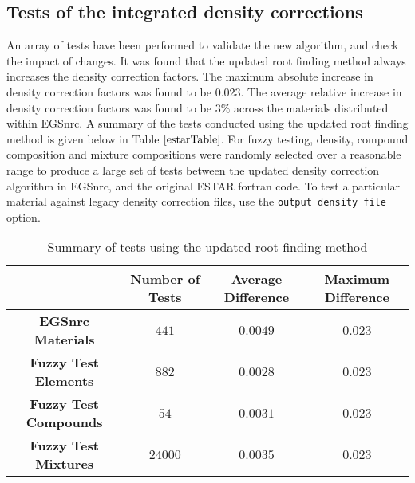 \subsection{Tests of the integrated density corrections}
An array of tests have been performed to validate the new algorithm, and check the impact of changes. It was found that the updated root finding method always increases the density correction factors. The maximum absolute increase in density correction factors was found to be 0.023. The average relative increase in density correction factors was found to be $3\%$ across the materials distributed within EGSnrc. A summary of the tests conducted using the updated root finding method is given below in Table $\ref{estarTable}$. For fuzzy testing, density, compound composition and mixture compositions were randomly selected over a reasonable range to produce a large set of tests between the updated density correction algorithm in EGSnrc, and the original ESTAR fortran code. To test a particular material against legacy density correction files, use the {\tt output density file} option.
\begin{table}[phtb]
\begin{center}
\begin{tabular}{|c | c c c |}
 \hline
 $ $ & \textbf{Number of Tests} & \textbf{Average Difference} & \textbf{Maximum Difference}\\ [0.5ex]
 \hline\hline
 \textbf{EGSnrc Materials} & $441$ & $0.0049$ & $0.023$\\
 \hline
 \textbf{Fuzzy Test Elements} & $882$ & $0.0028$ & $0.023$ \\
 \hline
 \textbf{Fuzzy Test Compounds} & $54$ & $0.0031$ & $0.023$ \\
  \hline
 \textbf{Fuzzy Test Mixtures} & $24000$ & $0.0035$ & $0.023$ \\[1ex]
 \hline
\end{tabular}
\caption{\label{estarTable}Summary of tests using the updated root finding method}
\end{center}
\end{table}



